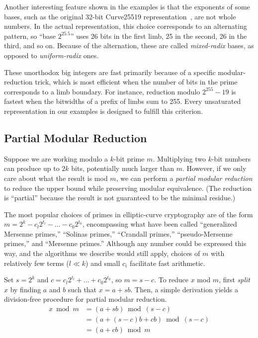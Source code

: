 \documentclass[conference,letterpaper]{IEEEtran}
\begin{document}
Another interesting feature shown in the examples is that the exponents of some
bases, such as the original 32-bit Curve25519 representation~\cite{curve25519}, are not whole numbers.
In the actual representation, this choice corresponds to an alternating pattern, so ``base $2^{25.5}$'' uses 26 bits in the first limb, 25 in the second, 26 in the third, and so on.
Because of the alternation, these are called \emph{mixed-radix} bases, as opposed to \emph{uniform-radix} ones.

These unorthodox big integers are fast primarily because of a specific modular-reduction trick, which is most efficient when the number of bits in the prime corresponds to a limb boundary.
For instance, reduction modulo $2^{255}-19$ is fastest when the bitwidths of a prefix of limbs sum to 255.
Every unsaturated representation in our examples is designed to fulfill this criterion.

\subsection{Partial Modular Reduction}
\label{solinasreduce}

Suppose we are working modulo a $k$-bit prime $m$.
Multiplying two $k$-bit numbers can produce up to $2k$ bits, potentially much larger than $m$.
However, if we only care about what the result is mod $m$, we can perform a \emph{partial modular reduction} to reduce the upper bound while preserving modular equivalence.
(The reduction is ``partial'' because the result is not guaranteed to be the minimal residue.)

The most popular choices of primes in elliptic-curve cryptography are of the form $m = 2^k - c_l 2^{t_l} - \ldots - c_0 2^{t_0}$, encompassing what have been called ``generalized Mersenne primes,'' ``Solinas primes,'' ``Crandall primes,'' ``pseudo-Mersenne primes,'' and ``Mersenne primes.''
Although any number could be expressed this way, and the algorithms we describe would still apply, choices of $m$ with relatively few terms ($l \ll k$) and small $c_i$ facilitate fast arithmetic.

Set $s=2^k$ and $c = c_l 2^{t_l} + \ldots + c_0 2^{t_0}$, so $m = s - c$.
To reduce $x$ mod $m$, first \emph{split} $x$ by finding $a$ and $b$ such that $x = a + sb$.
Then, a simple derivation yields a division-free procedure for partial modular reduction.
\begin{align*}
x \bmod m &= (a + sb) \bmod (s - c) \\
         &= (a + (s-c)b + cb) \bmod (s - c) \\
         &= (a + cb) \bmod m
\end{align*}
\end{document}

